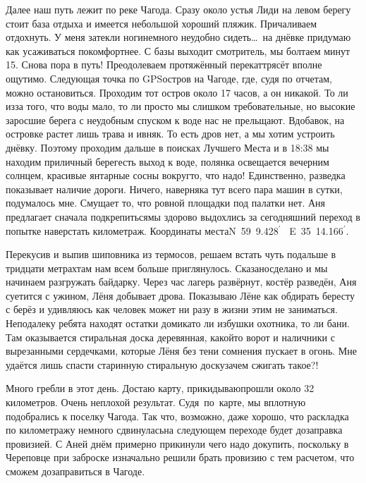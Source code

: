 Далее наш путь лежит по реке Чагода. Сразу около устья Лиди на левом берегу стоит база отдыха и имеется небольшой хороший пляжик. Причаливаем отдохнуть. У меня затекли ноги\mdash немного неудобно сидеть\ldots~на днёвке придумаю как усаживаться покомфортнее. С базы выходит смотритель, мы болтаем минут 15. Снова пора в путь! Преодолеваем протяжённый перекат\mdash трясёт вполне ощутимо. Следующая точка по GPS\mdash остров на Чагоде, где, судя по отчетам, можно остановиться. Проходим тот остров около 17 часов, а он никакой. То ли из\sdash за того, что воды мало, то ли просто мы слишком требовательные, но высокие заросшие берега с неудобным спуском к воде нас не прельщают. Вдобавок, на островке растет лишь трава и ивняк. То есть дров нет, а мы хотим устроить днёвку. Поэтому проходим дальше в поисках Лучшего Места и в 18:38 мы находим приличный берег\mdash есть выход к воде, полянка освещается вечерним солнцем, красивые янтарные сосны вокруг\mdash то, что надо! Единственно, разведка показывает наличие дороги. Ничего, наверняка тут всего пара машин в сутки, подумалось мне. Смущает то, что ровной площадки под палатки нет. Аня предлагает сначала подкрепиться\mdash мы здорово выдохлись за сегодняшний переход в попытке наверстать километраж. Координаты места\mdash N~59\degree~9.428$^\prime$~ E~35\degree~14.166$^\prime$.

Перекусив и выпив шиповника из термосов, решаем встать чуть подальше в тридцати метрах\mdash там нам всем больше приглянулось. Сказано\sdash сделано и мы начинаем разгружать байдарку. Через час лагерь развёрнут, костёр разведён, Аня суетится с ужином, Лёня добывает дрова. Показываю Лёне как обдирать бересту с берёз и удивляюсь как человек может ни разу в жизни этим не заниматься. Неподалеку ребята находят остатки домика\mdash то ли избушки охотника, то ли бани. Там оказывается стиральная доска деревянная, какой\sdash то ворот и наличники с вырезанными сердечками, которые Лёня без тени сомнения пускает в огонь. Мне удаётся лишь спасти старинную стиральную доску\mdash зачем сжигать такое?! 

Много гребли в этот день. Достаю карту, прикидываю\mdash прошли около 32 километров. Очень неплохой результат. Судя~по~карте, мы вплотную подобрались к поселку Чагода. Так что, возможно, даже хорошо, что раскладка по километражу немного сдвинулась\mdash на следующем переходе будет дозаправка провизией. С Аней днём примерно прикинули чего надо докупить, поскольку в Череповце при заброске изначально решили брать провизию с тем расчетом, что сможем дозаправиться в Чагоде.

